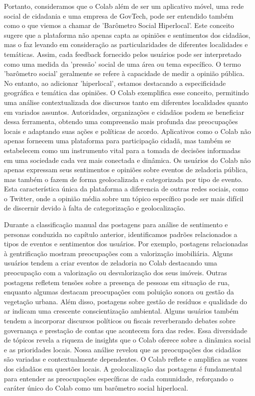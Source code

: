 Portanto, consideramos que o Colab além de ser um aplicativo móvel, uma rede social de cidadania e uma empresa de GovTech, pode ser entendido também como o que viemos a chamar de 'Barômetro Social Hiperlocal'. Este conceito sugere que a plataforma não apenas capta as opiniões e sentimentos dos cidadãos, mas o faz levando em consideração as particularidades de diferentes localidades e temáticas. Assim, cada feedback fornecido pelos usuários pode ser interpretado como uma medida da 'pressão' social de uma área ou tema específico. O termo 'barômetro social' geralmente se refere à capacidade de medir a opinião pública. No entanto, ao adicionar 'hiperlocal', estamos destacando a especificidade geográfica e temática das opiniões. O Colab exemplifica esse conceito, permitindo uma análise contextualizada dos discursos tanto em diferentes localidades quanto em variados assuntos. Autoridades, organizações e cidadãos podem se beneficiar dessa ferramenta, obtendo uma compreensão mais profunda das preocupações locais e adaptando suas ações e políticas de acordo. Aplicativos como o Colab não apenas fornecem uma plataforma para participação cidadã, mas também se estabelecem como um instrumento vital para a tomada de decisões informadas em uma sociedade cada vez mais conectada e dinâmica. Os usuários do Colab não apenas expressam seus sentimentos e opiniões sobre eventos de zeladoria pública, mas também o fazem de forma geolocalizada e categorizada por tipo de evento. Esta característica única da plataforma a diferencia de outras redes sociais, como o Twitter, onde a opinião média sobre um tópico específico pode ser mais difícil de discernir devido à falta de categorização e geolocalização.

Durante a classificação manual das postagens para análise de sentimento e personas conduzida no capítulo anterior, identificamos padrões relacionados a tipos de eventos e sentimentos dos usuários. Por exemplo, postagens relacionadas à gentrificação mostram preocupações com a valorização imobiliária. Alguns usuários tendem a criar eventos de zeladoria no Colab destacando uma preocupação com a valorização ou desvalorização dos seus imóveis. Outras postagens refletem tensões sobre a presença de pessoas em situação de rua, enquanto algumas destacam preocupações com poluição sonora ou gestão da vegetação urbana. Além disso, postagens sobre gestão de resíduos e qualidade do ar indicam uma crescente conscientização ambiental. Alguns usuários também tendem a incorporar discursos políticos ou fiscais reverberando debates sobre governança e prestação de contas que acontecem fora das redes. Essa diversidade de tópicos revela a riqueza de insights que o Colab oferece sobre a dinâmica social e as prioridades locais. Nossa análise revelou que as preocupações dos cidadãos são variadas e contextualmente dependentes. O Colab reflete e amplifica as vozes dos cidadãos em questões locais. A geolocalização das postagens é fundamental para entender as preocupações específicas de cada comunidade, reforçando o caráter único do Colab como um barômetro social hiperlocal.

